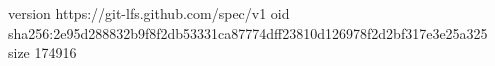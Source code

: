 version https://git-lfs.github.com/spec/v1
oid sha256:2e95d288832b9f8f2db53331ca87774dff23810d126978f2d2bf317e3e25a325
size 174916
